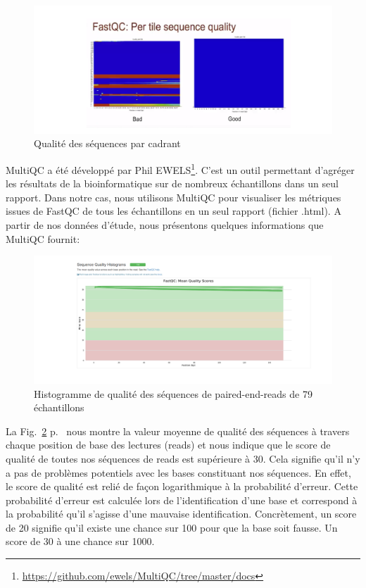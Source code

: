 \documentclass[a4paper,11pt]{article}
\begin{document}
\begin{figure}
  \begin{center}
    \includegraphics[width=16cm]{Images/Fastqc_Plots7}
  \end{center}
  \caption{Qualité des séquences par cadrant}
  \label{fig-Fastqc_Plots7}
\end{figure}


\newpage

MultiQC a été développé par Phil
EWELS\footnote{\url{https://github.com/ewels/MultiQC/tree/master/docs}}. C'est
un outil permettant d’agréger les résultats de la bioinformatique sur
de nombreux échantillons dans un seul rapport. Dans notre cas, nous
utilisons MultiQC pour visualiser les métriques issues de FastQC de
tous les échantillons en un seul rapport (fichier .html).  A partir de
nos données d'étude, nous présentons quelques informations que MultiQC
fournit:

\begin{figure}
  \begin{center}
    \includegraphics[width=16cm]{Images/MultiQC_Plots1}
  \end{center}
  \caption{Histogramme de qualité des séquences de
    \og{}paired-end-reads\fg{} de 79 échantillons}
  \label{fig-MultiQC_Plots1}
\end{figure}

La Fig.~\ref{fig-MultiQC_Plots1} p.~\pageref{fig-MultiQC_Plots1} nous
montre la valeur moyenne de qualité des séquences à travers chaque
position de base des lectures (reads) et nous indique que le score de
qualité de toutes nos séquences de reads est supérieure à 30. Cela
signifie qu'il n'y a pas de problèmes potentiels avec les bases
constituant nos séquences. En effet, le score de qualité est relié de
façon logarithmique à la probabilité d'erreur. Cette probabilité
d'erreur est calculée lors de l'identification d'une base et
correspond à la probabilité qu'il s'agisse d'une mauvaise
identification. Concrètement, un score de 20 signifie qu'il existe une
chance sur 100 pour que la base soit fausse. Un score de 30 à une
chance sur 1000.
\end{document}
